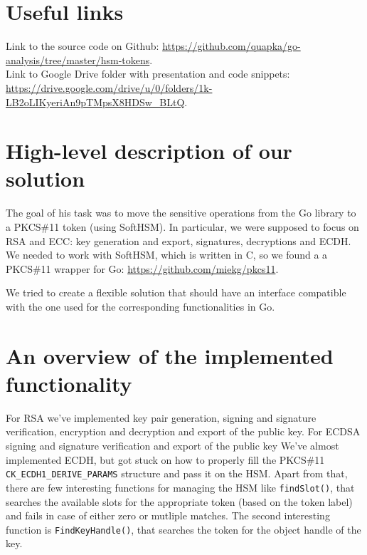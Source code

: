 \documentclass[a4paper]{scrartcl}
\subtitle{}
\begin{document}

\section{Useful links}
Link to the source code on Github: \url{https://github.com/quapka/go-analysis/tree/master/hsm-tokens}.\\
Link to Google Drive folder with presentation and code snippets: \url{https://drive.google.com/drive/u/0/folders/1k-LB2oLIKyeriAn9pTMpsX8HDSw_BLtQ}.

\section{High-level description of our solution }
The goal of his task was to move the sensitive operations from the Go library to a PKCS\#11 token (using SoftHSM). In particular, we were supposed to focus on RSA and ECC: key generation and export, signatures, decryptions and ECDH. We needed to work with SoftHSM, which is written in C, so we found a a PKCS\#11 wrapper for Go: \url{https://github.com/miekg/pkcs11}.

We tried to create a flexible solution that should have an interface compatible with the one used for the corresponding functionalities in Go.


\section{An overview of the implemented functionality}
For RSA we've implemented key pair generation, signing and signature verification, encryption and decryption and export of the public key. For ECDSA signing and signature verification and export of the public key We've almost implemented ECDH, but got stuck on how to properly fill the PKCS\#11 \verb+CK_ECDH1_DERIVE_PARAMS+ structure and pass it on the HSM. Apart from that, there are few interesting functions for managing the HSM like \lstinline[columns=fixed]{findSlot()}, that searches the available slots for the appropriate token (based on the token label) and fails in case of either zero or mutliple matches. The second interesting function is \lstinline[columns=fixed]{FindKeyHandle()}, that searches the token for the object handle of the key.
\end{document}
